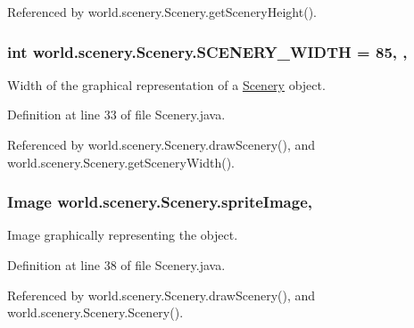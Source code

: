 Referenced by world.\-scenery.\-Scenery.\-get\-Scenery\-Height().

\hypertarget{classworld_1_1scenery_1_1_scenery_affb047c028883c6d069a03ef0f1caeb8}{
\subsubsection[{S\-C\-E\-N\-E\-R\-Y\-\_\-\-W\-I\-D\-T\-H}]{\setlength{\rightskip}{0pt plus 5cm}int world.\-scenery.\-Scenery.\-S\-C\-E\-N\-E\-R\-Y\-\_\-\-W\-I\-D\-T\-H = 85\hspace{0.3cm}{\ttfamily [static]}, {\ttfamily [protected]}, {\ttfamily [inherited]}}}\label{classworld_1_1scenery_1_1_scenery_affb047c028883c6d069a03ef0f1caeb8}


Width of the graphical representation of a \hyperlink{classworld_1_1scenery_1_1_scenery}{Scenery} object. 



Definition at line 33 of file Scenery.\-java.



Referenced by world.\-scenery.\-Scenery.\-draw\-Scenery(), and world.\-scenery.\-Scenery.\-get\-Scenery\-Width().

\hypertarget{classworld_1_1scenery_1_1_scenery_a512d9c0a154e6843389e343d80843326}{
\subsubsection[{sprite\-Image}]{\setlength{\rightskip}{0pt plus 5cm}Image world.\-scenery.\-Scenery.\-sprite\-Image\hspace{0.3cm}{\ttfamily [protected]}, {\ttfamily [inherited]}}}\label{classworld_1_1scenery_1_1_scenery_a512d9c0a154e6843389e343d80843326}


Image graphically representing the object. 



Definition at line 38 of file Scenery.\-java.



Referenced by world.\-scenery.\-Scenery.\-draw\-Scenery(), and world.\-scenery.\-Scenery.\-Scenery().

